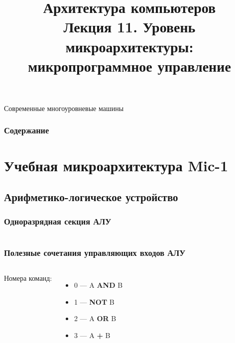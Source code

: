 \newcommand{\h}{%
handout,%
}



\title[Уровень микроархитектуры (1)]{Архитектура компьютеров\texorpdfstring{\\}{ }Лекция 11. Уровень микроархитектуры:
микропрограммное управление}



\begin{frame}
\titlepage
\end{frame}

\begin{frame}{Современные многоуровневые машины}
\end{frame}

\begin{frame}
\frametitle{Содержание}
\tableofcontents[hideallsubsections]
\end{frame}

\section[Mic-1]{Учебная микроархитектура Mic-1}
\subsection{Арифметико-логическое устройство}

\begin{frame}[plain]
\frametitle{Одноразрядная секция АЛУ}
\begin{columns}

        \column{3.5cm}

        \column{9cm}
\end{columns}
\end{frame}


\begin{frame}
\frametitle{Полезные сочетания управляющих входов АЛУ}
\begin{columns}

        \column{3.5cm}
    Номера команд:
    \begin{itemize}
        \item 0 — A \textbf{AND} B
        \item 1 — \textbf{NOT} B
        \item 2 — A \textbf{OR} B
        \item 3 — A \textbf{+} B
    \end{itemize}

        \column{9cm}
    \vspace{-.3cm}
\end{columns}
\end{frame}

